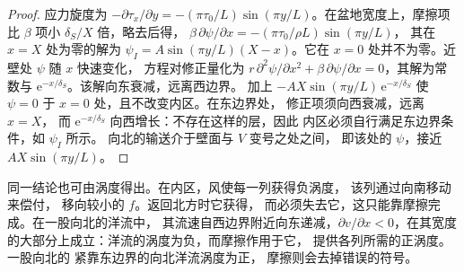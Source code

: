 \begin{proof}
应力旋度为 $-\partial\tau_x/\partial y = -(\pi\tau_0/L)\sin(\pi
y/L)$。在盆地宽度上，摩擦项比
$\beta$ 项小 $\delta_S/X$ 倍，略去后得，
$\beta\,\partial\psi/\partial x = -(\pi\tau_0/\rho L)\sin(\pi y/L)$，
其在 $x = X$ 处为零的解为 $\psi_I = A\sin(\pi y/L)(X - x)$。它在
$x = 0$ 处并不为零。近壁处 $\psi$ 随 $x$ 快速变化，
方程对修正量化为 $r\,\partial^2\psi/\partial x^2 + \beta\,\partial\psi/
\partial x = 0$，其解为常数与
$\mathrm e^{-x/\delta_S}$。该解向东衰减，远离西边界。
加上 $-AX\sin(\pi y/L)\,\mathrm e^{-x/\delta_S}$ 使 $\psi = 0$
于 $x = 0$ 处，且不改变内区。在东边界处，
修正项须向西衰减，远离 $x = X$，
而 $\mathrm e^{-x/\delta_S}$ 向西增长：不存在这样的层，因此
内区必须自行满足东边界条件，如 $\psi_I$ 所示。
向北的输送介于壁面与 $V$ 变号之处之间，
即该处的 $\psi$，接近 $AX\sin(\pi y/L)$。
\end{proof}

同一结论也可由涡度得出。在内区，风使每一列获得负涡度，
该列通过向南移动来偿付，
移向较小的 $f$。返回北方时它获得，
而必须失去它，这只能靠摩擦完成。在一股向北的洋流中，
其流速自西边界附近向东递减，$\partial
v/\partial x < 0$，在其宽度的大部分上成立：洋流的涡度为负，而摩擦作用于它，
提供各列所需的正涡度。一股向北的
紧靠东边界的向北洋流涡度为正，
摩擦则会去掉错误的符号。

